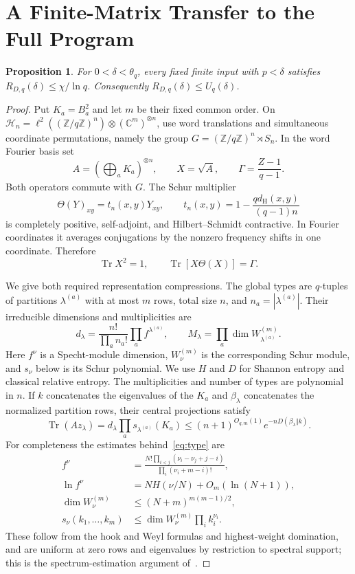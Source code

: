 \documentclass[12pt,letterpaper,onecolumn]{article}
\newtheorem{proposition}[theorem]{Proposition}
\DeclareMathOperator{\Tr}{Tr}
\newcommand{\C}{\mathbb C}
\newcommand{\Z}{\mathbb Z}
\newcommand{\HH}{\mathcal H}
\newcommand{\hamming}{d_{\mathrm H}}
\begin{document}
\section{A Finite-Matrix Transfer to the Full Program}
\begin{proposition}\label{prop:transfer}
For $0<\delta<\theta_q$, every fixed finite input with $p<\delta$ satisfies $R_{D,q}(\delta)\le\chi/\ln q$. Consequently $R_{D,q}(\delta)\le U_q(\delta)$.
\end{proposition}
\begin{proof}
Put $K_a=B_a^2$ and let $m$ be their fixed common order. On
$\HH_n=\ell^2((\Z/q\Z)^n)\otimes(\C^m)^{\otimes n}$, use word translations and simultaneous coordinate permutations, namely the group $G=(\Z/q\Z)^n\rtimes S_n$. In the word Fourier basis set
\[
A=(\bigoplus_aK_a)^{\otimes n},\qquad X=\sqrt A,\qquad
\Gamma=\frac{Z-1}{q-1}.
\]
Both operators commute with $G$. The Schur multiplier
\[
\Theta(Y)_{xy}=t_n(x,y)Y_{xy},\qquad
t_n(x,y)=1-\frac{q\hamming(x,y)}{(q-1)n}
\]
is completely positive, self-adjoint, and Hilbert--Schmidt contractive. In Fourier coordinates it averages conjugations by the nonzero frequency shifts in one coordinate. Therefore
\begin{equation}\label{eq:rayleigh}
\Tr X^2=1,\qquad \Tr[X\Theta(X)]=\Gamma.
\end{equation}

We give both required representation compressions. The global types are $q$-tuples of partitions $\lambda^{(a)}$ with at most $m$ rows, total size $n$, and $n_a=|\lambda^{(a)}|$. Their irreducible dimensions and multiplicities are
\[
d_\lambda=\frac{n!}{\prod_an_a!}\prod_af^{\lambda^{(a)}},\qquad
M_\lambda=\prod_a\dim W_{\lambda^{(a)}}^{(m)}.
\]
Here $f^\nu$ is a Specht-module dimension, $W_\nu^{(m)}$ is the corresponding Schur module, and $s_\nu$ below is its Schur polynomial. We use $H$ and $D$ for Shannon entropy and classical relative entropy. The multiplicities and number of types are polynomial in $n$. If $k$ concatenates the eigenvalues of the $K_a$ and $\beta_\lambda$ concatenates the normalized partition rows, their central projections satisfy
\begin{equation}\label{eq:type}
\Tr(Az_\lambda)
=d_\lambda\prod_as_{\lambda^{(a)}}(K_a)
\le(n+1)^{O_{q,m}(1)}e^{-nD(\beta_\lambda\Vert k)}.
\end{equation}
For completeness the estimates behind~\eqref{eq:type} are
\begin{align*}
f^\nu&=\frac{N!\prod_{i<j}(\nu_i-\nu_j+j-i)}
{\prod_i(\nu_i+m-i)!},\\
\ln f^\nu&=NH(\nu/N)+O_m(\ln(N+1)),\\
\dim W_\nu^{(m)}&\le(N+m)^{m(m-1)/2},\\
s_\nu(k_1,\ldots,k_m)&\le\dim W_\nu^{(m)}\prod_i k_i^{\nu_i}.
\end{align*}
These follow from the hook and Weyl formulas and highest-weight domination, and are uniform at zero rows and eigenvalues by restriction to spectral support; this is the spectrum-estimation argument of~\cite{keyl}.


\end{proof}
\end{document}
